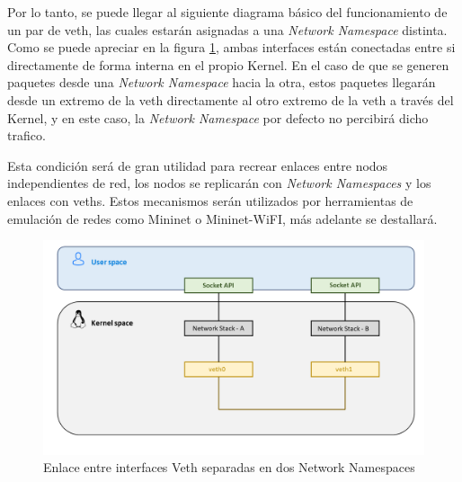 Por lo tanto, se puede llegar al siguiente diagrama básico del funcionamiento de un par de \gls{veth}, las cuales estarán asignadas a una \textit{Network Namespace} distinta.  Como se puede apreciar en la figura \ref{fig:linuxNet_veth}, ambas interfaces están conectadas entre si directamente de forma interna en el propio Kernel. En el caso de que se generen paquetes desde una \textit{Network Namespace} hacia la otra, estos paquetes llegarán desde un extremo de la \gls{veth} directamente al otro extremo de la \gls{veth} a través del Kernel, y en este caso, la \textit{Network Namespace} por defecto no percibirá dicho trafico.\\
\par
Esta condición será de gran utilidad para recrear enlaces entre nodos independientes de red, los nodos se replicarán con \textit{Network Namespaces} y los enlaces con \gls{veth}s. Estos mecanismos serán utilizados por herramientas de emulación de redes como Mininet o Mininet-WiFI, más adelante se destallará.

\begin{figure}[ht]
    \centering
    \includegraphics[width=15.5cm]{archivos/img/teoria/user_kernel.png}
    \caption{Enlace entre interfaces Veth separadas en dos Network Namespaces}
    \label{fig:linuxNet_veth}
\end{figure}